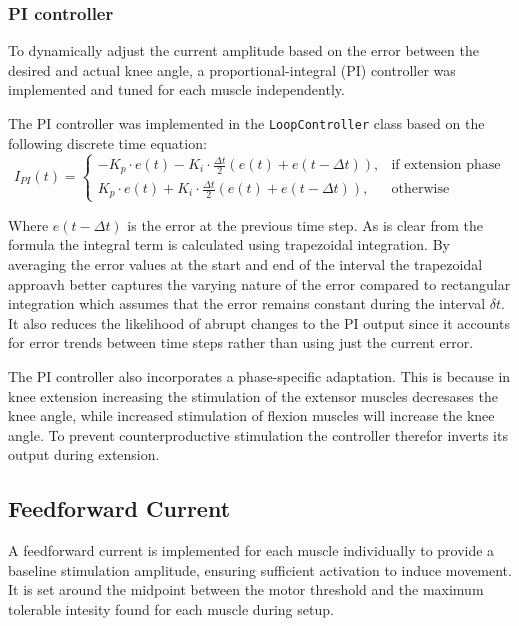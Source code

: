 \subsubsection{PI controller}
To dynamically adjust the current amplitude based on the error between the desired and actual knee angle, a proportional-integral (PI) controller was implemented and tuned for each muscle independently. 

The PI controller was implemented in the \texttt{LoopController} class based on the following discrete time equation:
\begin{equation}
I_{PI}(t) = 
\begin{cases} 
-K_p \cdot e(t) - K_i \cdot \frac{\Delta t}{2} \left(e(t) + e(t-\Delta t)\right), & \text{if extension phase} \\
K_p \cdot e(t) + K_i \cdot \frac{\Delta t}{2} \left(e(t) + e(t-\Delta t)\right), & \text{otherwise}
\end{cases}
\end{equation}

Where \( e(t-\Delta t) \) is the error at the previous time step. As is clear from the formula the integral term is calculated using trapezoidal integration. By averaging the error values at the start and end of the interval the trapezoidal approavh better captures the varying nature of the error compared to rectangular integration which assumes that the error remains constant during the interval \(\delta t\). It also reduces the likelihood of abrupt changes to the PI output since it accounts for error trends between time steps rather than using just the current error.

The PI controller also incorporates a phase-specific adaptation. This is because in knee extension increasing the stimulation of the extensor muscles decresases the knee angle, while increased stimulation of flexion muscles will increase the knee angle. To prevent counterproductive stimulation the controller therefor inverts its output during extension.

\subsection{Feedforward Current}
A feedforward current is implemented for each muscle individually to provide a baseline stimulation amplitude, ensuring sufficient activation to induce movement. It is set around the midpoint between the motor threshold and the maximum tolerable intesity found for each muscle during setup. 

